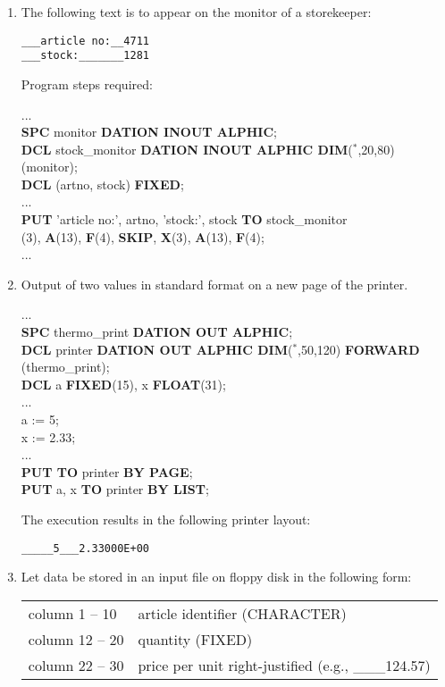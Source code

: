 \begin{enumerate}
\item The following text is to appear on the monitor of a storekeeper:

\begin{verbatim}
___article no:__4711
___stock:_______1281
\end{verbatim}

Program steps required:

...\\
{\bf SPC} monitor {\bf DATION INOUT ALPHIC};\\
{\bf DCL} stock\_monitor {\bf DATION INOUT ALPHIC DIM}($^*$,20,80)\\
 (monitor);\\
{\bf DCL} (artno, stock) {\bf FIXED};\\
...\\
{\bf PUT} 'article no:', artno, 'stock:', stock {\bf TO} stock\_monitor\\
(3), {\bf A}(13), {\bf F}(4), {\bf SKIP}, {\bf X}(3), {\bf A}(13), {\bf F}(4);\\
...

\item Output of two values in standard format on a new page of the
printer.

...\\
{\bf SPC} thermo\_print {\bf DATION OUT ALPHIC};\\
{\bf DCL} printer {\bf DATION OUT ALPHIC DIM}($^*$,50,120) {\bf FORWARD}\\
 (thermo\_print);\\
{\bf DCL} a {\bf FIXED}(15), x {\bf FLOAT}(31);\\
...\\
a := 5;\\
x := 2.33;\\
...\\
{\bf PUT TO} printer {\bf BY PAGE};\\
{\bf PUT} a, x {\bf TO} printer {\bf BY LIST};

The execution results in the following printer layout:

\begin{verbatim}
_____5___2.33000E+00
\end{verbatim}
\item Let data be stored in an input file on floppy disk in the
following form:

\begin{tabular}{l@{:}l}
column  1 -- 10 & article identifier (CHARACTER)\\
column 12 -- 20 & quantity (FIXED)\\
column 22 -- 30 & price per unit right-justified (e.g., \_\_\_124.57)
\end{tabular}


\end{enumerate}
